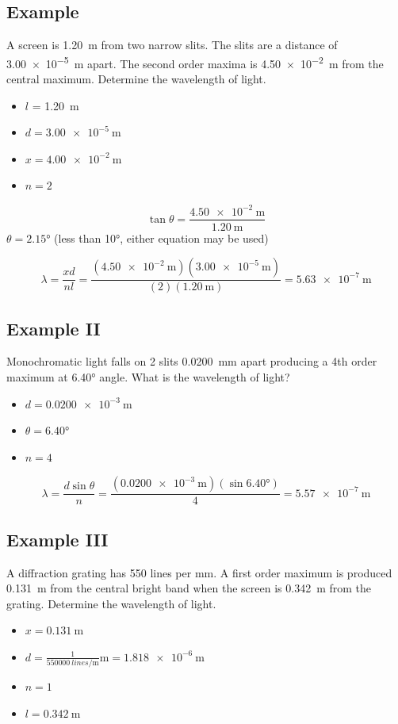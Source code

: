 \documentclass[a4paper,12pt]{article}
\begin{document}
\pagebreak
\subsection{Example}
A screen is \SI{1.20}{\m} from two narrow slits. The slits are a distance of \SI{3.00e-5}{\m} apart. The second order maxima is \SI{4.50e-2}{\m} from the central maximum. Determine the wavelength of light.
\begin{itemize}
    \item{$l$ = \SI{1.20}{\m}}
    \item{$d = \SI{3.00e-5}{\m}$}
    \item{$x = \SI{4.00e-2}{\m}$}
    \item{$n = 2$}
\end{itemize}

$$\tan{\theta} = \frac{ \SI{4.50e-2}{\m} }{ \SI{1.20}{\m} }$$
$\theta = \ang{2.15}$ (less than \ang{10}, either equation may be used)

$$\lambda = \frac{xd}{nl} = \frac{ (\SI{4.50e-2}{\m})(\SI{3.00e-5}{\m}) }{ (\num{2})(\SI{1.20}{\m}) } = \SI{5.63e-7}{\m}$$

\subsection{Example II}
Monochromatic light falls on 2 slits \SI{0.0200}{\milli\m} apart producing a 4th order maximum at \ang{6.40} angle. What is the wavelength of light?
\begin{itemize}
    \item{$d = \SI{0.0200e-3}{\m}$}
    \item{$\theta = \ang{6.40}$}
    \item{$n = 4$}
\end{itemize}

$$\lambda = \frac{d\sin{\theta}}{n} = \frac{ (\SI{0.0200e-3}{\m})(\sin{\ang{6.40}}) }{ \num{4} } = \SI{5.57e-7}{\m}$$

\subsection{Example III}
A diffraction grating has \num{550} lines per \si{\milli\m}. A first order maximum is produced \SI{0.131}{\m} from the central bright band when the screen is \SI{0.342}{\m} from the grating. Determine the wavelength of light.
\begin{itemize}
    \item{$x = \SI{0.131}{\m}$}
    \item{$d = \frac{1}{\SI{550000}{lines\per\m}}{\si{\m}} = \SI{1.818e-6}{\m}$}
    \item{$n = 1$}
    \item{$l = \SI{0.342}{\m}$}
\end{itemize}
\end{document}
